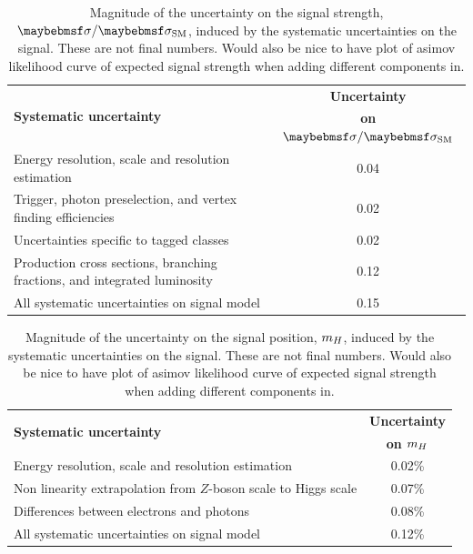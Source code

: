 \begin{table}[htbp]
\caption[Magnitude of the uncertainty on the signal strength, $\musm$, induced by the systematic uncertainties on the signal]{Magnitude of the uncertainty on the signal strength, $\musm$, induced by the systematic uncertainties on the signal. These are not final numbers. Would also be nice to have plot of asimov likelihood curve of expected signal strength when adding different components in.}
\begin{center}
\begin{tabular}{ l c }
\hline
\multirow{2}{*}{\textbf{Systematic uncertainty}} & \textbf{Uncertainty} \\
 &  \textbf{on $\musm$} \\
\hline
\hline
Energy resolution, scale and resolution estimation & 0.04\\
\hline
Trigger, photon preselection, and vertex finding efficiencies& 0.02\\
\hline
Uncertainties specific to tagged classes & 0.02\\
\hline
Production cross sections, branching fractions, and integrated luminosity & 0.12\\
\hline
\hline
All systematic uncertainties on signal model & 0.15 \\
\hline
\end{tabular}
\end{center}
\label{tab:systematics_mu}
\end{table}

\begin{table}[htbp]
\caption[Magnitude of the uncertainty on the signal position, $\mH$, induced by the systematic uncertainties on the signal]{Magnitude of the uncertainty on the signal position, $\mH$, induced by the systematic uncertainties on the signal. These are not final numbers. Would also be nice to have plot of asimov likelihood curve of expected signal strength when adding different components in.}
\begin{center}
\begin{tabular}{ l c }
\hline
\multirow{2}{*}{\textbf{Systematic uncertainty}} & \textbf{Uncertainty} \\
 &  \textbf{on $\mH$} \\
\hline
\hline
Energy resolution, scale and resolution estimation & 0.02\% \\
\hline
Non linearity extrapolation from $Z$-boson scale to Higgs scale & 0.07\% \\
\hline
Differences between electrons and photons & 0.08\% \\
\hline
\hline
All systematic uncertainties on signal model & 0.12\% \\
\hline
\end{tabular}
\end{center}
\label{tab:systematics_mh}
\end{table}

